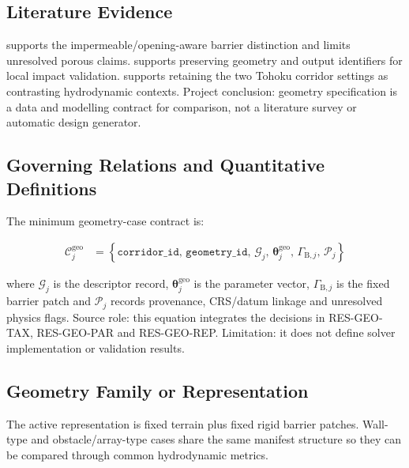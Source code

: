 
\subsection{Literature Evidence}
\label{sec:res-geo-spec-literature-evidence}

\textcite{deljesus2012porous} supports the impermeable/opening-aware
barrier distinction and limits unresolved porous claims.
\textcite{watanabe2022validation} supports preserving geometry and
output identifiers for local impact validation. \textcite{mori2012nationwide}
supports retaining the two Tohoku corridor settings as contrasting
hydrodynamic contexts. Project conclusion: geometry specification is a
data and modelling contract for comparison, not a literature survey or
automatic design generator.

\subsection{Governing Relations and Quantitative Definitions}
\label{sec:res-geo-spec-governing-relations}

The minimum geometry-case contract is:

\begin{align}
  \mathcal{C}^{\mathrm{geo}}_j
  &=
  \left\{
    \mathtt{corridor\_id},\,
    \mathtt{geometry\_id},\,
    \mathcal{G}_j,\,
    \boldsymbol{\theta}^{\mathrm{geo}}_j,\,
    \Gamma_{\mathrm{B},j},\,
    \mathcal{P}_j
  \right\}
  \label{eq:res-geo-spec-case-contract}
\end{align}

where $\mathcal{G}_j$ is the descriptor record,
$\boldsymbol{\theta}^{\mathrm{geo}}_j$ is the parameter vector,
$\Gamma_{\mathrm{B},j}$ is the fixed barrier patch and
$\mathcal{P}_j$ records provenance, CRS/datum linkage and unresolved
physics flags. Source role: this equation integrates the decisions in
RES-GEO-TAX, RES-GEO-PAR and RES-GEO-REP. Limitation: it does not
define solver implementation or validation results.

\subsection{Geometry Family or Representation}
\label{sec:res-geo-spec-geometry-family-representation}

The active representation is fixed terrain plus fixed rigid barrier
patches. Wall-type and obstacle/array-type cases share the same
manifest structure so they can be compared through common
hydrodynamic metrics.

